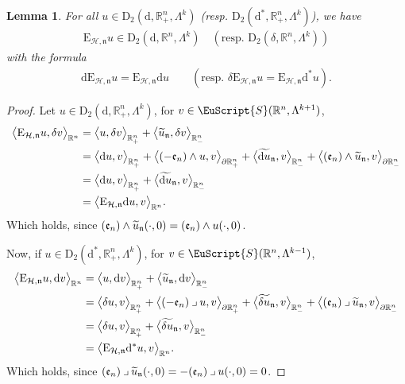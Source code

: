 \documentclass[10pt]{amsart}
\newtheorem{lemm}[theo]{Lemma}\newtheorem{prop}[theo]{Proposition}\newtheorem{coro}[theo]{Corollary}\newtheorem{conj}[theo]{Conjecture}
\theoremstyle{definition}\newtheorem{defi}[theo]{Definition}\newtheorem{rema}[theo]{Remark}\newtheorem{exam}[theo]{Example}\newtheorem{exem}[theo]{Example}\newtheorem{nota}[theo]{Notation}
\newcommand{\bbR}{\mathbb{R}}
\newcommand{\rmd}{\mathrm{d}}
\newcommand{\rmD}{\mathrm{D}}
\newcommand{\rmE}{\mathrm{E}}
\newcommand{\clH}{\mathcal{H}}
\newcommand{\fkn}{\mathfrak{n}}
\newcommand{\fke}{\mathfrak{e}}
\newcommand{\eus}{\EuScript}
\newcommand{\iprod}{\mathbin{\lrcorner}}
\let\oldtilde\tilde
\renewcommand*{\tilde}[1]{\mathchoice{\widetilde{#1}}{\widetilde{#1}}{\oldtilde{#1}}{\oldtilde{#1}}}
\begin{document}
\begin{lemm}\label{lem:ExtOpRn+DiffFormL2}
For all $u\in\rmD_{2}(\rmd,\bbR^n_+,\Lambda^{k})$ (resp. $\rmD_{2}({\rmd}^\ast,\bbR^n_+,\Lambda^{k})$), we have
\begin{align*}
\rmE _{\clH,\fkn} u \in \rmD_{2}\left(\rmd,\bbR^n,\Lambda^{k}\right) \quad\left(\text{resp. } \rmD_{2}\left(\delta,\bbR^n,\Lambda^{k}\right)\right)
\end{align*}
with the formula
\begin{align*}
\rmd \rmE_{\clH,\fkn} u = \rmE_{\clH,\fkn} \rmd u \qquad \left(\text{resp. } \delta \rmE_{\clH,\fkn} u = \rmE_{\clH,\fkn} \rmd^\ast u\right).
\end{align*}
\end{lemm}


\begin{proof}
Let $u\in\rmD_{2}(\rmd,\bbR^n_+,\Lambda^{k})$, for $v\in\eus{S}(\bbR^n,\Lambda^{k+1})$,
\begin{align*}
\big\langle \rmE _{\clH,\fkn} u, \delta v\big\rangle_{\bbR^n} &= \big\langle u, \delta v\big\rangle_{\bbR^n_+} + \big\langle \tilde{u}_{\fkn}, \delta v\big\rangle_{\bbR^n_{-}} \\
&= \big\langle \rmd u, v\big\rangle_{\bbR^n_+} + \big\langle (-\fke _n)\wedge u, v\big\rangle_{\partial\bbR^n_+} + \big\langle \widetilde{\rmd u}_{\fkn}, v\big\rangle_{\bbR^n_{-}} + \big\langle (\fke_n)\wedge \tilde{u}_{\fkn}, v\big\rangle_{\partial\bbR^n_-}\\
&= \big\langle \rmd u, v\big\rangle_{\bbR^n_+} + \big\langle \widetilde{\rmd u}_{\fkn}, v\big\rangle_{\bbR^n_{-}} \\
&= \big\langle \rmE_{\clH,\fkn} \rmd u, v\big\rangle_{\bbR^n} .
\end{align*}
Which holds, since $(\fke_n)\wedge \tilde{u}_{\fkn}(\cdot,0)=(\fke_n)\wedge {u}(\cdot,0)$.

Now, if $u\in\rmD_{2}(\rmd^\ast,\bbR^n_+,\Lambda^{k})$, for $v\in\eus{S}(\bbR^n,\Lambda^{k-1})$,
\begin{align*}
\big\langle \rmE_{\clH,\fkn} u, \rmd v\big\rangle_{\bbR^n} &= \big\langle u, \rmd v\big\rangle_{\bbR^n_+} + \big\langle \tilde{u}_{\fkn}, \rmd v\big\rangle_{\bbR^n_{-}} \\
&= \big\langle \delta u, v\big\rangle_{\bbR^n_+} + \big\langle (-\fke_n)\iprod u, v\big\rangle_{\partial\bbR^n_+} + \big\langle \widetilde{\delta u}_{\fkn}, v\big\rangle_{\bbR^n_{-}} + \big\langle (\fke_n)\iprod \tilde{u}_{\fkn}, v\big\rangle_{\partial\bbR^n_-}\\
&= \big\langle \delta u, v\big\rangle_{\bbR^n_+} + \big\langle \widetilde{\delta u}_{\fkn}, v\big\rangle_{\bbR^n_{-}} \\
&= \big\langle \rmE _{\clH,\fkn} \rmd^\ast u, v\big\rangle_{\bbR^n} .
\end{align*}
Which holds, since $(\fke_n)\iprod \tilde{u}_{\fkn}(\cdot,0)=-(\fke_n)\iprod {u}(\cdot,0)=0$.
\end{proof}
\end{document}
